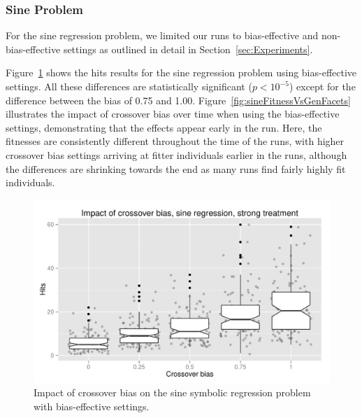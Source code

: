 \documentclass{sig-alternate}
\begin{document}
\pagebreak

\subsubsection{Sine Problem}
\label{sec:sineRegression}

For the sine regression problem, we limited our runs to bias-effective and non-bias-effective settings as outlined in
detail in Section~\ref{sec:Experiments}.

Figure~\ref{fig:sineBiasResultsStrong} shows the hits results for the sine regression problem using bias-effective
settings. All these differences are statistically significant ($p < 10^{-5}$) except for the difference between the
bias of 0.75 and 1.00. Figure~\ref{fig:sineFitnessVsGenFacets} illustrates the impact of crossover bias over time
when using the bias-effective settings, demonstrating that the effects appear early in the run. Here, the fitnesses are
consistently different throughout the time of the runs, with higher crossover bias settings arriving at fitter
individuals earlier in the runs, although the differences are shrinking towards the end as many runs find fairly highly
fit individuals.

\begin{figure}
\centering
\includegraphics[width=0.45 \textwidth]{Plots/Sine_XO_impact_strong_boxplot.pdf}
\caption{Impact of crossover bias on the sine symbolic regression problem with bias-effective settings.}
\label{fig:sineBiasResultsStrong}
\end{figure}

%
%
%
%

%
%
%
%
\end{document}
